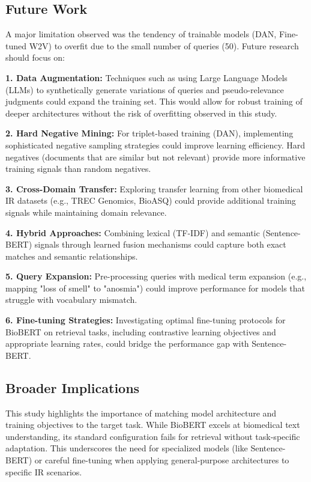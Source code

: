 \documentclass[sigconf,nonacm]{acmart}
\begin{document}
\subsection{Future Work}
A major limitation observed was the tendency of trainable models (DAN, Fine-tuned W2V) to overfit due to the small number of queries (50). Future research should focus on:

\textbf{1. Data Augmentation:} Techniques such as using Large Language Models (LLMs) to synthetically generate variations of queries and pseudo-relevance judgments could expand the training set. This would allow for robust training of deeper architectures without the risk of overfitting observed in this study.

\textbf{2. Hard Negative Mining:} For triplet-based training (DAN), implementing sophisticated negative sampling strategies could improve learning efficiency. Hard negatives (documents that are similar but not relevant) provide more informative training signals than random negatives.

\textbf{3. Cross-Domain Transfer:} Exploring transfer learning from other biomedical IR datasets (e.g., TREC Genomics, BioASQ) could provide additional training signals while maintaining domain relevance.

\textbf{4. Hybrid Approaches:} Combining lexical (TF-IDF) and semantic (Sentence-BERT) signals through learned fusion mechanisms could capture both exact matches and semantic relationships.

\textbf{5. Query Expansion:} Pre-processing queries with medical term expansion (e.g., mapping "loss of smell" to "anosmia") could improve performance for models that struggle with vocabulary mismatch.

\textbf{6. Fine-tuning Strategies:} Investigating optimal fine-tuning protocols for BioBERT on retrieval tasks, including contrastive learning objectives and appropriate learning rates, could bridge the performance gap with Sentence-BERT.

\subsection{Broader Implications}
This study highlights the importance of matching model architecture and training objectives to the target task. While BioBERT excels at biomedical text understanding, its standard configuration fails for retrieval without task-specific adaptation. This underscores the need for specialized models (like Sentence-BERT) or careful fine-tuning when applying general-purpose architectures to specific IR scenarios.



\end{document}
